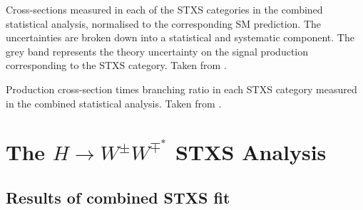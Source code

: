 

\begin{table}
    \caption{Cross-sections measured in each of the STXS categories in the combined statistical analysis, normalised to the corresponding SM prediction. The uncertainties are broken down into a statistical and systematic component. The grey band represents the theory uncertainty on the signal production corresponding to the STXS category. Taken from .}
    \label{fig:stxs-pois-bar-plot}
\end{table}

\begin{table}
    \caption{Production cross-section times \HWW branching ratio in each STXS category measured in the combined statistical analysis. Taken from .}
    \label{fig:stxs-xsec-uncertainties}
\end{table}


\section{The $H\rightarrow W^{\pm}W^{\mp^*}$ STXS Analysis}
\subsection{Results of combined STXS fit}
